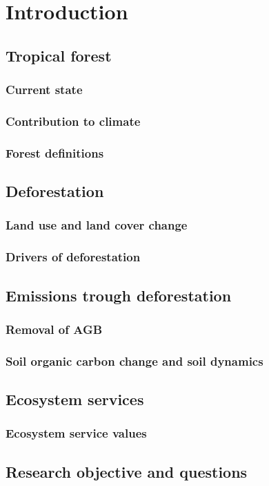 \section{Introduction}
\label{sec:introduction}
\subsection{Tropical forest}
\subsubsection{Current state}
\subsubsection{Contribution to climate}
\subsubsection{Forest definitions}
\subsection{Deforestation}
\subsubsection{Land use and land cover change}
\subsubsection{Drivers of deforestation}
\subsection{Emissions trough deforestation}
\subsubsection{Removal of AGB}
\subsubsection{Soil organic carbon change and soil dynamics}
\subsection{Ecosystem services}
\subsubsection{Ecosystem service values}
\subsection{Research objective and questions}
